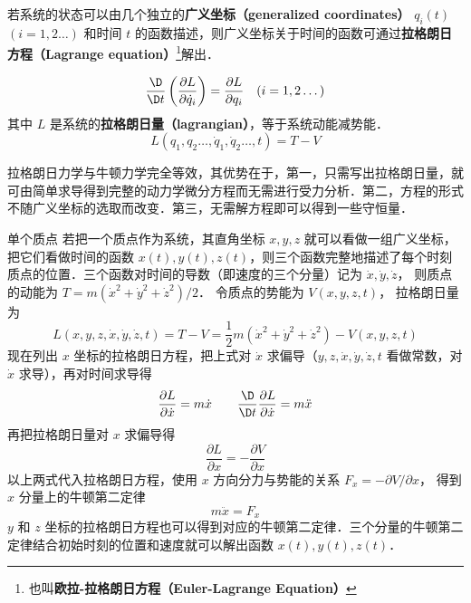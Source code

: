 

若系统的状态可以由几个独立的\textbf{广义坐标（generalized coordinates）} $q_i(t)$ $(i=1,2\dots)$ 和时间 $t$ 的函数描述，则广义坐标关于时间的函数可通过\textbf{拉格朗日方程（Lagrange equation）}\footnote{也叫\textbf{欧拉-拉格朗日方程（Euler-Lagrange Equation）}}解出．

\begin{equation}
\frac{\D}{{\D t}}\left( {\frac{{\partial L}}{{\partial \dot q_i}}} \right) = \frac{{\partial L}}{{\partial q_i}}
\quad (i=1,2\dots)
\end{equation}
其中 $L$ 是系统的\textbf{拉格朗日量（lagrangian）}，等于系统动能减势能．
\begin{equation}
L(q_1,q_2\dots,\dot q_1,\dot q_2\dots,t) = T - V
\end{equation}


拉格朗日力学与牛顿力学完全等效，其优势在于，第一，只需写出拉格朗日量，就可由简单求导得到完整的动力学微分方程而无需进行受力分析．第二，方程的形式不随广义坐标的选取而改变．第三，无需解方程即可以得到一些守恒量．

\begin{exam}{单个质点}\label{Lagrng_ex1}
若把一个质点作为系统，其直角坐标 $x,y,z$ 就可以看做一组广义坐标，把它们看做时间的函数 $x(t), y(t), z(t)$，则三个函数完整地描述了每个时刻质点的位置．三个函数对时间的导数（即速度的三个分量）记为 $\dot x, \dot y, \dot z$， 则质点的动能为 $T=m(\dot x^2+\dot y^2+\dot z^2)/2$． 令质点的势能为 $V(x,y,z,t)$， 拉格朗日量为
\begin{equation}
L(x,y,z, \dot x, \dot y, \dot z, t) = T-V = \frac 12 m(\dot x^2+\dot y^2+\dot z^2) - V(x,y,z,t)
\end{equation}
现在列出 $x$ 坐标的拉格朗日方程，把上式对 $\dot x$ 求偏导（$y,z, \dot x, \dot y, \dot z, t$ 看做常数，对 $\dot x$ 求导），再对时间求导得
\begin{equation}
\frac{{\partial L}}{{\partial \dot x}} = m\dot x
\qquad
\frac{\D}{{\D t}}\frac{{\partial L}}{{\partial \dot x}} = m\ddot x
\end{equation}
再把拉格朗日量对 $x$ 求偏导得
\begin{equation}
\frac{{\partial L}}{{\partial x}} =  - \frac{{\partial V}}{{\partial x}}
\end{equation}
以上两式代入拉格朗日方程，使用 $x$ 方向分力与势能的关系 ${F_x} =  - \partial V/\partial x$， 得到 $x$ 分量上的牛顿第二定律
\begin{equation}
m\ddot x = {F_x}
\end{equation}
$y$ 和 $z$ 坐标的拉格朗日方程也可以得到对应的牛顿第二定律．三个分量的牛顿第二定律结合初始时刻的位置和速度就可以解出函数 $x(t), y(t), z(t)$． 
\end{exam}

